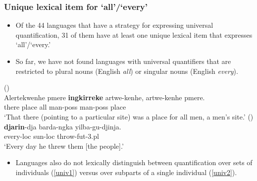 \documentclass{article}
\begin{document}
\subsubsection{Unique lexical item for `all'/`every'}

\begin{itemize}
\item  Of the 44 languages that have a strategy for expressing universal quantification, 31 of them have at least one unique lexical item that expresses `all'/`every.'
\item So far, we have not found languages  with universal quantifiers that are restricted to plural nouns (English {\it all}) or singular nouns (English {\it every}).
\end{itemize}

\begin{exe}
   (\citealt[132]{wilkins89})\\
  \gll Alertekwenhe pmere \textbf{ingkirreke} artwe-kenhe, artwe-kenhe pmere.\\
  there place all man-{\sc poss} man-{\sc poss} place\\
  \glt `That there (pointing to a particular site)
  was a place for all men, a men's site.'
   (\citealt[48]{sands89}) \\
  \gll \textbf{djarin}-dja barda-ngka yilba-gu-djinja.\\
  every-{\sc loc} sun-{\sc loc}   throw-{\sc fut}-3.{\sc pl}\\
  \glt    `Every day he threw them [the people].'
\end{exe}

\begin{itemize}
\item Languages also do not lexically distinguish between quantification over sets of individuals (\ref{univ1}) versus over subparts of a single individual (\ref{univ2}).
\end{itemize}
\end{document}
